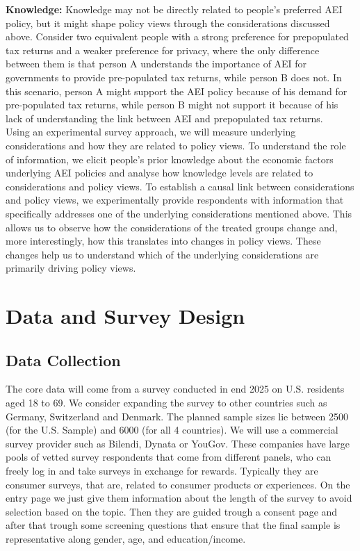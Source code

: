 \documentclass[11pt]{article}
\begin{document}
\textbf{Knowledge:} Knowledge may not be directly related to people's preferred AEI policy, but it might shape policy views through the considerations discussed above. Consider two equivalent people with a strong preference for prepopulated tax returns and a weaker preference for privacy, where the only difference between them is that person A understands the importance of AEI for governments to provide pre-populated tax returns, while person B does not. In this scenario, person A might support the AEI policy because of his demand for pre-populated tax returns, while person B might not support it because of his lack of understanding the link between AEI and prepopulated tax returns. \\[-0.5em]

Using an experimental survey approach, we will measure underlying considerations and how they are related to policy views. To understand the role of information, we elicit people's prior knowledge about the economic factors underlying AEI policies and analyse how knowledge levels are related to considerations and policy views. To establish a causal link between considerations and policy views, we experimentally provide respondents with information that specifically addresses one of the underlying considerations mentioned above.  This allows us to observe how the considerations of the treated groups change and, more interestingly, how this translates into changes in policy views. These changes help us to understand which of the underlying considerations are primarily driving policy views. 
\section{Data and Survey Design}
\subsection{Data Collection}
The core data will come from a survey conducted in end 2025 on U.S. residents aged 18 to 69. We consider expanding the survey to other countries such as Germany, Switzerland and Denmark. The planned sample sizes lie between 2500 (for the U.S. Sample) and 6000 (for all 4 countries). We will use a commercial survey provider such as Bilendi, Dynata or YouGov. These companies have large pools of vetted survey respondents that come from different panels, who can freely log in and take surveys in exchange for rewards. Typically they are consumer surveys, that are, related to consumer products or experiences. On the entry page we just give them information about the length of the survey to avoid selection based on the topic. Then they are guided trough a consent page and after that trough some screening questions that ensure that the final sample is representative along gender, age, and education/income. 
\end{document}
